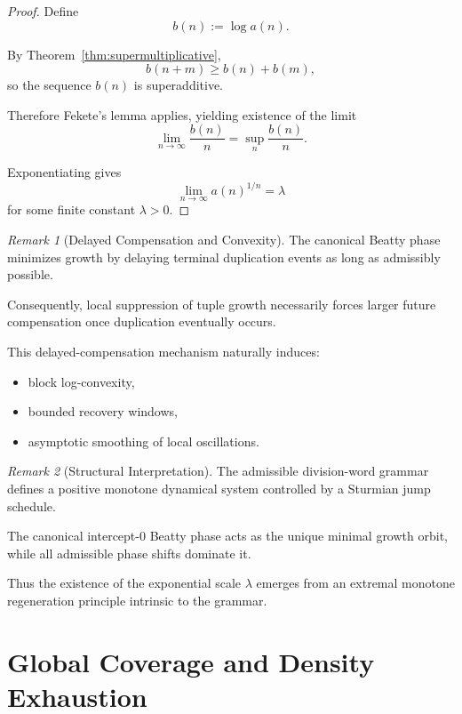 \documentclass[12pt, oneside]{article}
\numberwithin{equation}{section}
\theoremstyle{definition}
\theoremstyle{plain}
\theoremstyle{remark}
\newtheorem*{remark}{Remark}
\begin{document}
\begin{proof}
Define
\[
b(n):=\log a(n).
\]

By Theorem~\ref{thm:supermultiplicative},
\[
b(n+m)\ge b(n)+b(m),
\]
so the sequence $b(n)$ is superadditive.

Therefore Fekete's lemma applies, yielding existence of the limit
\[
\lim_{n\to\infty}\frac{b(n)}{n}
=
\sup_n \frac{b(n)}{n}.
\]

Exponentiating gives
\[
\lim_{n\to\infty} a(n)^{1/n}
=
\lambda
\]
for some finite constant $\lambda>0$.
\end{proof}


\begin{remark}[Delayed Compensation and Convexity]
The canonical Beatty phase minimizes growth by delaying terminal
duplication events as long as admissibly possible.

Consequently, local suppression of tuple growth necessarily forces
larger future compensation once duplication eventually occurs.

This delayed-compensation mechanism naturally induces:
\begin{itemize}
\item block log-convexity,
\item bounded recovery windows,
\item asymptotic smoothing of local oscillations.
\end{itemize}
\end{remark}


\begin{remark}[Structural Interpretation]
The admissible division-word grammar defines a positive monotone
dynamical system controlled by a Sturmian jump schedule.

The canonical intercept-$0$ Beatty phase acts as the unique minimal
growth orbit, while all admissible phase shifts dominate it.

Thus the existence of the exponential scale $\lambda$ emerges from
an extremal monotone regeneration principle intrinsic to the grammar.
\end{remark}

\section{Global Coverage and Density Exhaustion}
\label{sec:8a-global}
\end{document}
